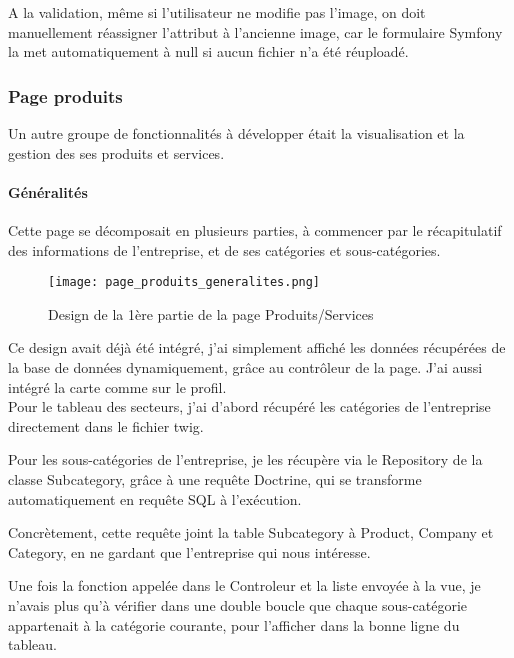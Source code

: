A la validation, même si l'utilisateur ne modifie pas l'image, on doit manuellement réassigner l'attribut à l'ancienne image, car le formulaire Symfony la met automatiquement à null si aucun fichier n'a été réuploadé.


\subsubsection{Page produits}
Un autre groupe de fonctionnalités à développer était la visualisation et la gestion des ses produits et services.

\paragraph*{Généralités}
\label{generalites}


Cette page se décomposait en plusieurs parties, à commencer par le récapitulatif des informations de l'entreprise, et de ses catégories et sous-catégories.

\begin{figure}[H]
    \texttt{[image: page\_produits\_generalites.png]}
    \caption{Design de la 1ère partie de la page Produits/Services}
\end{figure}

Ce design avait déjà été intégré, j'ai simplement affiché les données récupérées de la base de données dynamiquement, grâce au contrôleur de la page.
J'ai aussi intégré la carte comme sur le profil.\\

Pour le tableau des secteurs, j'ai d'abord récupéré les catégories de l'entreprise directement dans le fichier twig.

Pour les sous-catégories de l'entreprise, je les récupère via le Repository de la classe Subcategory, grâce à une requête Doctrine, qui se transforme automatiquement en requête SQL à l'exécution.

Concrètement, cette requête joint la table Subcategory à Product, Company et Category, en ne gardant que l'entreprise qui nous intéresse.

Une fois la fonction appelée dans le Controleur et la liste envoyée à la vue, je n'avais plus qu'à vérifier dans une double boucle que chaque sous-catégorie appartenait à la catégorie courante, pour l'afficher dans la bonne ligne du tableau.



